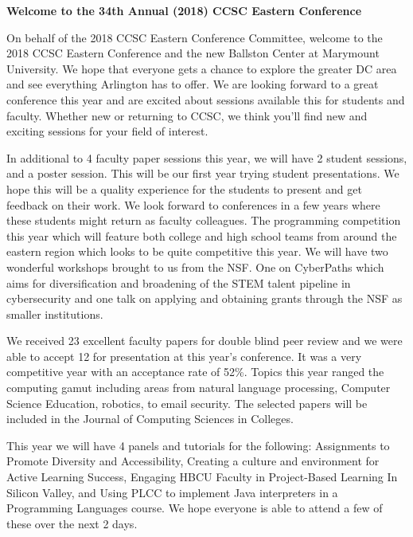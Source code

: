 \documentclass{article}
\begin{document}
\begingroup
  \centering
  \textbf{\LARGE Welcome to the 34th Annual (2018) CCSC Eastern Conference}\\
\endgroup

\vspace{10pt}

On behalf of the 2018 CCSC Eastern Conference Committee, welcome to the 2018
CCSC Eastern Conference and the new Ballston Center at Marymount University.
We hope that everyone gets a chance to explore the greater DC area and see
everything Arlington has to offer. We are looking forward to a great conference
this year and are excited about sessions available this for students and
faculty. Whether new or returning to CCSC, we think you’ll find new and
exciting sessions for your field of interest.

In additional to 4 faculty paper sessions this year, we will have 2 student
sessions, and a poster session. This will be our first year trying student
presentations. We hope this will be a quality experience for the students to
present and get feedback on their work. We look forward to conferences in a few
years where these students might return as faculty colleagues. The programming
competition this year which will feature both college and high school teams
from around the eastern region which looks to be quite competitive this year.
We will have two wonderful workshops brought to us from the NSF. One on
CyberPaths which aims for diversification and broadening of the STEM talent
pipeline in cybersecurity and one talk on applying and obtaining grants through
the NSF as smaller institutions.

We received 23 excellent faculty papers for double blind peer review and we
were able to accept 12 for presentation at this year’s conference. It was a
very competitive year with an acceptance rate of 52\%.  Topics this year ranged
the computing gamut including areas from natural language processing, Computer
Science Education, robotics, to email security. The selected papers will be
included in the Journal of Computing Sciences in Colleges.

This year we will have 4 panels and tutorials for the following: Assignments to
Promote Diversity and Accessibility, Creating a culture and environment for
Active Learning Success, Engaging HBCU Faculty in Project-Based Learning In
Silicon Valley, and Using PLCC to implement Java interpreters in a Programming
Languages course. We hope everyone is able to attend a few of these over the
next 2 days.
\end{document}
